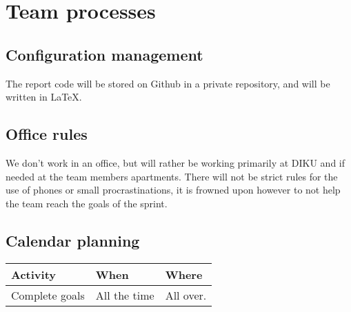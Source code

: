 \section{Team processes}

\subsection{Configuration management}

The report code will be stored on Github in a private repository, and will be
written in \LaTeX.


\subsection{Office rules}

We don't work in an office, but will rather be working primarily at DIKU and if
needed at the team members apartments. There will not be strict rules for the
use of phones or small procrastinations, it is frowned upon however to not help
the team reach the goals of the sprint.

\subsection{Calendar planning}

\begin{table}
    \centering
    \begin{tabular}{l|l|l}
        \rowcolor{Gray}
        \textbf{Activity} & \textbf{When} & \textbf{Where}\\\hline
         Complete goals   & All the time  & All over.
    \end{tabular}
    \label{tab:planning}
\end{table}
